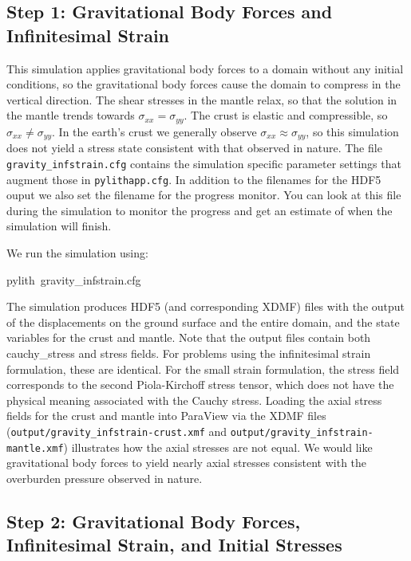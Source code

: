 \subsection{Step 1: Gravitational Body Forces and Infinitesimal Strain}

This simulation applies gravitational body forces to a domain without
any initial conditions, so the gravitational body forces cause the
domain to compress in the vertical direction. The shear stresses in
the mantle relax, so that the solution in the mantle trends towards
$\sigma_{xx}=\sigma_{yy}$. The crust is elastic and compressible,
so $\sigma_{xx}\neq\sigma_{\mathit{yy}}$. In the earth's crust we
generally observe $\sigma_{\mathit{xx}}\approx\sigma_{\mathit{yy}}$,
so this simulation does not yield a stress state consistent with that
observed in nature. The file \texttt{gravity\_infstrain.cfg} contains
the simulation specific parameter settings that augment those in \texttt{pylithapp.cfg}.
In addition to the filenames for the HDF5 ouput we also set the filename
for the progress monitor. You can look at this file during the simulation
to monitor the progress and get an estimate of when the simulation
will finish.

We run the simulation using:
\begin{lyxcode}
pylith~gravity\_infstrain.cfg
\end{lyxcode}
The simulation produces HDF5 (and corresponding XDMF) files with the
output of the displacements on the ground surface and the entire domain,
and the state variables for the crust and mantle. Note that the output
files contain both cauchy\_stress and stress fields. For problems
using the infinitesimal strain formulation, these are identical. For
the small strain formulation, the stress field corresponds to the
second Piola-Kirchoff stress tensor, which does not have the physical
meaning associated with the Cauchy stress. Loading the axial stress
fields for the crust and mantle into ParaView via the XDMF files (\texttt{output/gravity\_infstrain-crust.xmf}
and \texttt{output/gravity\_infstrain-mantle.xmf}) illustrates how
the axial stresses are not equal. We would like gravitational body
forces to yield nearly axial stresses consistent with the overburden
pressure observed in nature. 


\subsection{Step 2: Gravitational Body Forces, Infinitesimal Strain, and Initial
Stresses}

